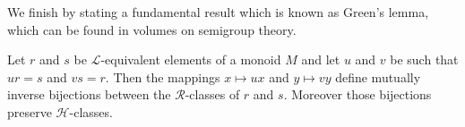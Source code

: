 \documentclass[a4paper,UKenglish,numberwithinsect,cleveref]{lipics-v2021}
\newcommand{\HH}{\mathrel{\mathscr{H}}}
\newcommand{\RR}{\mathrel{\mathscr{R}}}
\newcommand{\LL}{\mathrel{\mathscr{L}}}
\begin{document}
We finish by stating a fundamental result which is known as Green's lemma, which can be found in volumes on semigroup theory.
\begin{lemma} \label{lem:green}
    Let $r$ and $s$ be $\LL$-equivalent elements of a monoid $M$ and let $u$ and $v$ be such that $ur = s$ and $vs=r$. Then the mappings $x\mapsto ux$ and $y\mapsto vy$ define mutually inverse bijections between the $\RR$-classes of $r$ and $s$. Moreover those bijections preserve $\HH$-classes. 
\end{lemma}
 
\end{document}
